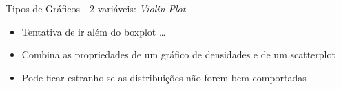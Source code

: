 \documentclass{beamer}\usepackage[]{graphicx}\usepackage[]{color}
\begin{document}
\begin{frame}{Tipos de Gráficos - 2 variáveis: \emph{Violin Plot}}
  
\begin{itemize}
  \item Tentativa de ir além do boxplot \ldots \pause
  \vfill
  \item Combina as propriedades de um gráfico de densidades e de um scatterplot\pause
  \vfill
  \item Pode ficar estranho se as distribuições não forem bem-comportadas 
\end{itemize}

\end{frame} 
\end{document}
